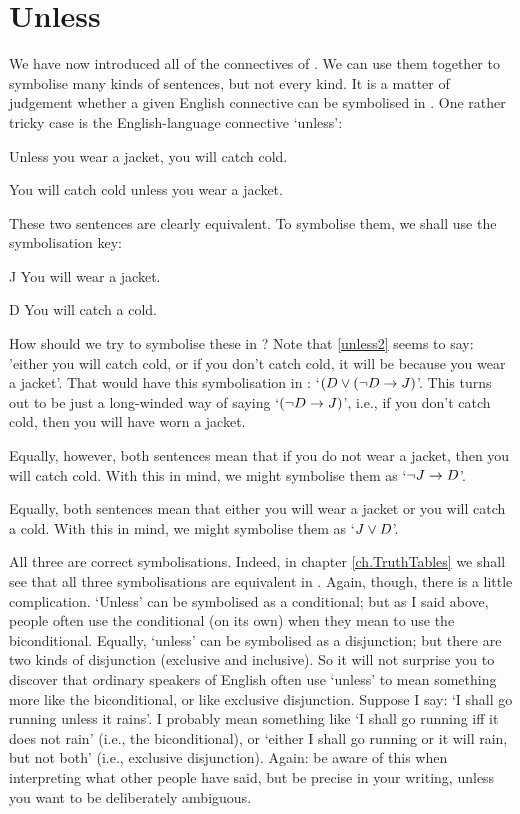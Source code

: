 \section{Unless}
We have now introduced all of the connectives of \TFL. We can use them together to symbolise many kinds of sentences, but not every kind. It is a matter of judgement whether a given English connective can be symbolised in \TFL. One rather tricky case is the English-language connective `unless':
\begin{earg}
\item[\ex{unless1}] Unless you wear a jacket, you will catch cold. 
\item[\ex{unless2}] You will catch cold unless you wear a jacket. 
\end{earg}
These two sentences are clearly equivalent. To symbolise them, we shall use the symbolisation key:
	\begin{ekey}
		\item[J] You will wear a jacket.
		\item[D] You will catch a cold.
	\end{ekey}
How should we try to symbolise these in \TFL? Note that \ref{unless2} seems to say: 'either you will catch cold, or if you don't catch cold, it will be because you wear a jacket'. That would have this symbolisation in \TFL: `$(D \vee (\neg D \rightarrow J)$'. This turns out to be just a long-winded way of saying `$(\neg D \rightarrow J)$', i.e., if you don't catch cold, then you will have worn a jacket. 

Equally, however, both sentences mean that if you do not wear a jacket, then you will catch cold. With this in mind, we might symbolise them as `$\neg J \rightarrow D$'. 

Equally, both sentences mean that either you will wear a jacket or you will catch a cold. With this in mind, we might symbolise them as `$J \vee D$'.

All three are correct symbolisations. Indeed, in chapter \ref{ch.TruthTables} we shall see that all three symbolisations are equivalent in \TFL.
Again, though, there is a little complication. `Unless' can be symbolised as a conditional; but as I said above, people often use the conditional (on its own) when they mean to use the biconditional. Equally, `unless' can be symbolised as a disjunction; but there are two kinds of disjunction (exclusive and inclusive). So it will not surprise you to discover that ordinary speakers of English often use `unless' to mean something more like the biconditional, or like exclusive disjunction. Suppose I say: `I shall go running unless it rains'. I probably mean something like `I shall go running iff it does not rain' (i.e., the biconditional), or  `either I shall go running or it will rain, but not both' (i.e., exclusive disjunction). Again: be aware of this when interpreting what other people have said, but be precise in your writing, unless you want to be deliberately ambiguous.

